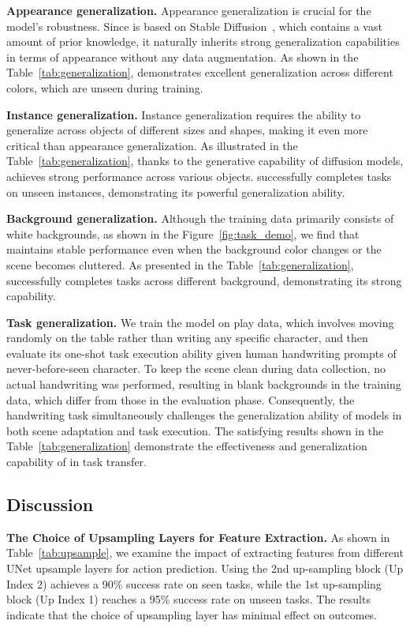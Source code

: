\noindent\textbf{Appearance generalization.} Appearance generalization is crucial for the model's robustness. Since \system is based on Stable Diffusion~\cite{rombach2022high}, which contains a vast amount of prior knowledge, it naturally inherits strong generalization capabilities in terms of appearance without any data augmentation. As shown in the Table~\ref{tab:generalization}, \system demonstrates excellent generalization across  different colors, which are unseen during training.

\noindent\textbf{Instance generalization.} Instance generalization requires the ability to generalize across objects of different sizes and shapes, making it even more critical than appearance generalization. As illustrated in the Table~\ref{tab:generalization}, thanks to the generative capability of diffusion models, \system achieves strong performance across various objects. \system successfully completes tasks on unseen instances, demonstrating its powerful generalization ability.

\noindent\textbf{Background generalization.} Although the training data primarily consists of white backgrounds, as shown in the Figure~\ref{fig:task_demo}, we find that \system maintains stable performance even when the background color changes or the scene becomes cluttered. As presented in the Table~\ref{tab:generalization}, \system successfully completes tasks across different background, demonstrating its strong capability.

\noindent\textbf{Task generalization.} We train the model on play data, which involves moving randomly on the table rather than writing any specific character, and then evaluate its one-shot task execution ability given human handwriting prompts of never-before-seen character. To keep the scene clean during data collection, no actual handwriting was performed, resulting in blank backgrounds in the training data, which differ from those in the evaluation phase. Consequently, the handwriting task simultaneously challenges the generalization ability of models in both scene adaptation and task execution. The satisfying results shown in the Table~\ref{tab:generalization} demonstrate the effectiveness and generalization capability of \system in task transfer.


\subsection{Discussion}
\label{sec:ablation}

\noindent\textbf{The Choice of Upsampling Layers for Feature Extraction.}
As shown in Table~\ref{tab:upsample}, we examine the impact of extracting features from different UNet upsample layers for action prediction. Using the 2nd up-sampling block (Up Index 2) achieves a 90\% success rate on seen tasks, while the 1st up-sampling block (Up Index 1) reaches a 95\% success rate on unseen tasks. The results indicate that the choice of upsampling layer has minimal effect on outcomes.

